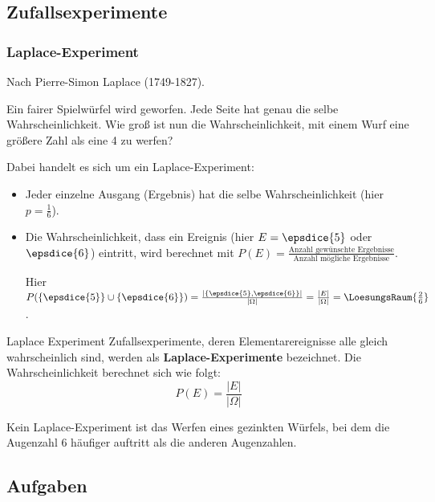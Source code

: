 
\subsection{Zufallsexperimente}

\subsubsection{Laplace-Experiment}
Nach Pierre-Simon Laplace (1749-1827).

Ein fairer Spielwürfel wird geworfen. Jede Seite hat genau die selbe
Wahrscheinlichkeit. Wie groß ist nun die Wahrscheinlichkeit, mit einem
Wurf eine größere Zahl als eine 4 zu werfen?


Dabei handelt es sich um ein Laplace-Experiment:
\begin{itemize}
\item Jeder einzelne Ausgang (Ergebnis) hat die selbe Wahrscheinlichkeit
      (hier $p = \frac{1}{6}$).
\item Die Wahrscheinlichkeit, dass ein Ereignis (hier $E = \epsdice{5}$
oder $\epsdice{6}$) eintritt, wird berechnet mit $P(E)
= \frac{\text{Anzahl gewünschte Ergebnisse}}{\text{Anzahl
mögliche Ergebnisse}}$.

Hier $P(\{\epsdice{5}\}\cup\{\epsdice{6}\}) = \frac{\left|\left\{\epsdice{5}, \epsdice{6}\right\}\right|}{|\Omega|}= \frac{|E|}{|\Omega|}=\LoesungsRaum{\frac{2}{6}}$.
\end{itemize}

\begin{definition}{Laplace Experiment}{}
  Zufallsexperimente, deren Elementarereignisse alle gleich wahrscheinlich sind, werden als
  \textbf{Laplace-Experimente} bezeichnet. Die Wahrscheinlichkeit berechnet sich wie folgt:
  $$P(E) = \frac{|E|}{|\Omega|}$$
\end{definition}


Kein Laplace-Experiment ist \zB das Werfen eines gezinkten Würfels,
bei dem die Augenzahl 6 häufiger auftritt als die anderen Augenzahlen.

\subsection*{Aufgaben}


